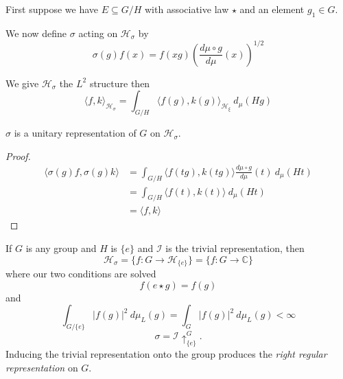 \documentclass{article}
\begin{document}
First suppose we have $E \subseteq G/H$ with associative law $\star$ and an element $g_1 \in G$.
    

    
\begin{define}
    We now define  $\sigma$  acting on $\mathcal{H}_{\sigma}$  by 
    \[%
        \sigma(g)f(x) = f(xg) \left(\frac{d \mu \circ g}{d \mu}(x)\right)^{1/2}
    \]%
\end{define}

\begin{define}
We give $\mathcal{H}_{\sigma}$  the $L^{2}$  structure then 
\[
    \langle f,k \rangle_{\mathcal{H}_{\sigma}} = \int_{G/H} \langle f(g), k(g) \rangle_{\mathcal{H}_{\xi}} \ d_\mu(Hg) 
\]
\end{define}

\begin{theorem}
    $\sigma$ is a unitary representation of $G$ on $\mathcal{H}_{\sigma}$.
\end{theorem}

\begin{proof}
    \[%
        \begin{split}
            \langle \sigma (g) f, \sigma(g) k \rangle 
            &= \int_{G/H} \langle f(tg), k(tg) \rangle \frac{d \mu \circ g}{d \mu}(t) \ d_{\mu}(Ht) \\
            &= \int_{G/H} \langle f(t), k(t) \rangle \ d_{\mu}(Ht) \\
            &= \langle f,k \rangle
        \end{split} 
    \]%
\end{proof}

\begin{example}
    If $G$ is any group and $H$ is $\{ e \}$ and $\mathcal{I}$ is the trivial representation, then
    \[ 
        \mathcal{H}_{\sigma} = \{ f: G \rightarrow \mathcal{H}_{\{ e \}} \} = \{ f: G \rightarrow \mathbb{C} \} 
    \] 
    where our two conditions are solved
    \[ 
        f(e \star g ) = f(g) 
    \]
    and
    \[ 
        \int_{G/\{ e \}} | f(g) |^{2} \ d\mu_{L}(g) = \int_{G} | f(g) |^{2} \ d\mu_{L}(g) < \infty 
    \]
    \[ \sigma = \mathcal{I}\uparrow^{G}_{\{ e \}} .\]
    Inducing the trivial representation onto the group produces the \textit{right regular representation} on $G$.
\end{example}
\end{document}
